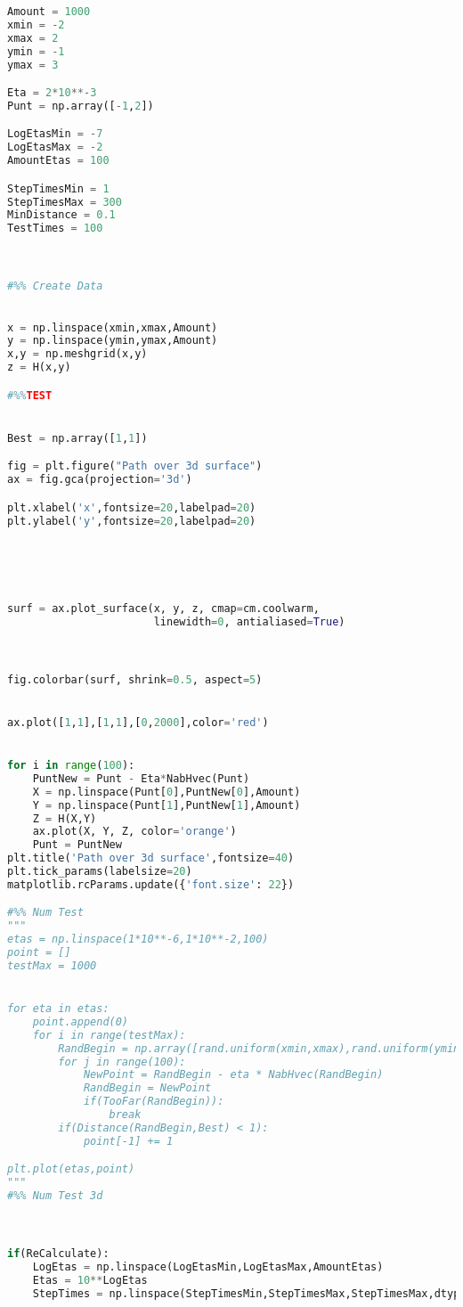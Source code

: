 \documentclass[a4paper]{article}
\begin{document}
\begin{lstlisting}[language=Python]
Amount = 1000
xmin = -2
xmax = 2
ymin = -1
ymax = 3

Eta = 2*10**-3
Punt = np.array([-1,2])

LogEtasMin = -7
LogEtasMax = -2
AmountEtas = 100

StepTimesMin = 1
StepTimesMax = 300
MinDistance = 0.1
TestTimes = 100



#%% Create Data
   

x = np.linspace(xmin,xmax,Amount)
y = np.linspace(ymin,ymax,Amount)
x,y = np.meshgrid(x,y)
z = H(x,y)

#%%TEST


Best = np.array([1,1])

fig = plt.figure("Path over 3d surface")
ax = fig.gca(projection='3d')

plt.xlabel('x',fontsize=20,labelpad=20)
plt.ylabel('y',fontsize=20,labelpad=20)





surf = ax.plot_surface(x, y, z, cmap=cm.coolwarm,
                       linewidth=0, antialiased=True)



fig.colorbar(surf, shrink=0.5, aspect=5)


ax.plot([1,1],[1,1],[0,2000],color='red')


for i in range(100):
    PuntNew = Punt - Eta*NabHvec(Punt)
    X = np.linspace(Punt[0],PuntNew[0],Amount)
    Y = np.linspace(Punt[1],PuntNew[1],Amount)
    Z = H(X,Y)
    ax.plot(X, Y, Z, color='orange')
    Punt = PuntNew
plt.title('Path over 3d surface',fontsize=40)
plt.tick_params(labelsize=20)
matplotlib.rcParams.update({'font.size': 22}) 

#%% Num Test
"""
etas = np.linspace(1*10**-6,1*10**-2,100)
point = []
testMax = 1000


for eta in etas:
    point.append(0)
    for i in range(testMax):
        RandBegin = np.array([rand.uniform(xmin,xmax),rand.uniform(ymin,ymax)])
        for j in range(100):
            NewPoint = RandBegin - eta * NabHvec(RandBegin)
            RandBegin = NewPoint
            if(TooFar(RandBegin)):
                break
        if(Distance(RandBegin,Best) < 1):
            point[-1] += 1

plt.plot(etas,point)
"""
#%% Num Test 3d



if(ReCalculate):
    LogEtas = np.linspace(LogEtasMin,LogEtasMax,AmountEtas)
    Etas = 10**LogEtas
    StepTimes = np.linspace(StepTimesMin,StepTimesMax,StepTimesMax,dtype=int)
    

\end{lstlisting}
\end{document}
